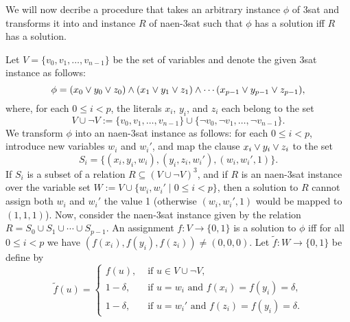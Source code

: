 \documentclass[12pt]{amsart}
\numberwithin{equation}{section}
\theoremstyle{plain}
\theoremstyle{definition}
\newcommand{\sat}{\acs{sat}\xspace}
\newcommand{\nae}{\acs{nae}\xspace}
\newcommand{\naen}{\acs{naen}\xspace}
\newcommand{\NP}{\acs{NP}\xspace}
\begin{document}
We will now decribe a procedure that takes an arbitrary instance $\phi$ 
of 3\sat and transforms it into and instance $R$ of \naen-3\sat such that
$\phi$ has a solution iff $R$ has a solution.

Let $V = \{v_0, v_1, \dots, v_{n-1}\}$ be the set of variables and denote the
given 3\sat instance as follows:
\[
\phi = (x_0 \vee y_0 \vee z_0) \wedge (x_1 \vee y_1 \vee z_1) \wedge 
\cdots (x_{p-1} \vee y_{p-1} \vee z_{p-1}),
\]
where, for each $0\leq i< p$, the literals $x_i$, $y_i$, and $z_i$ each belong
to the set 
\[
V \cup \neg V := 
\{v_0, v_1, \dots, v_{n-1}\} \cup
\{\neg v_0, \neg v_1, \dots, \neg v_{n-1}\}.
\]
We transform $\phi$ into an \naen-3\sat instance as follows:
for each $0\leq i< p$, introduce new variables $w_i$ and $w_i'$, and map the
clause
$x_i \vee y_i \vee z_i$ to the set
\[
S_i = \{ (x_i, y_i, w_i), (y_i, z_i, w_i'), (w_i, w_i', 1)\}.
\]
If $S_i$ is a subset of a relation $R \subseteq (V \cup \neg V)^3$, 
and if $R$ is an \naen-3\sat instance over the variable set
$W:= V\cup \{w_i, w_i'\mid 0\leq i<p\}$, then a solution to $R$ 
cannot assign both $w_i$ and $w_i'$ the value 1 
(otherwise $(w_i, w_i', 1)$ would be mapped to $(1,1,1)$). 
Now, consider the \naen-3\sat instance given by the relation
$R = S_0 \cup S_1 \cup \cdots \cup S_{p-1}$.
An assignment $f : V \to \{0,1\}$ is a solution to $\phi$ iff for all
$0\leq i < p$ we have $(f(x_i), f(y_i), f(z_i)) \neq (0,0,0)$.
Let $\tilde{f}: W \to \{0,1\}$ be define by
\[
\tilde{f}(u) = 
  \begin{cases}
    f(u), & \text{ if $u \in V\cup \neg V$,}\\
    1-\delta, & \text{ if $u =w_i$ and $f(x_i) = f(y_i) = \delta$,}\\
    1-\delta, & \text{ if $u =w_i'$ and $f(z_i) = f(y_i) = \delta$.}
  \end{cases}
\]

\end{document}
